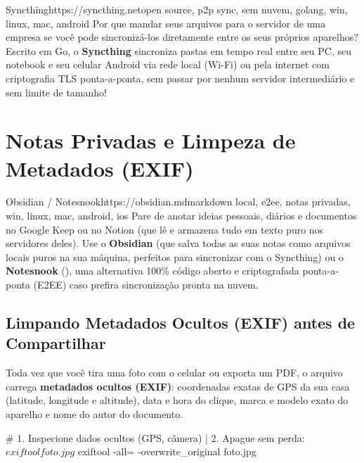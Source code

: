 \documentclass{pousadaguide}
\begin{document}
\begin{ferramenta}[goat,logo=syncthing]{Syncthing}{https://syncthing.net}{open source, p2p sync, sem nuvem, golang, win, linux, mac, android}
Por que mandar seus arquivos para o servidor de uma empresa se você pode sincronizá-los diretamente entre os seus próprios aparelhos? Escrito em Go, o \textbf{Syncthing} sincroniza pastas em tempo real entre seu PC, seu notebook e seu celular Android via rede local (Wi-Fi) ou pela internet com criptografia TLS ponta-a-ponta, sem passar por nenhum servidor intermediário e sem limite de tamanho! 
\end{ferramenta}

\section{Notas Privadas e Limpeza de Metadados (EXIF)}

\begin{ferramenta}[goat,logo=obsidian]{Obsidian / Notesnook}{https://obsidian.md}{markdown local, e2ee, notas privadas, win, linux, mac, android, ios}
Pare de anotar ideias pessoais, diários e documentos no Google Keep ou no Notion (que lê e armazena tudo em texto puro nos servidores deles). Use o \textbf{Obsidian} (que salva todas as suas notas como arquivos  locais puros na sua máquina, perfeitos para sincronizar com o Syncthing) ou o \textbf{Notesnook} (), uma alternativa 100\% código aberto e criptografada ponta-a-ponta (E2EE) caso prefira sincronização pronta na nuvem. 
\end{ferramenta}

\subsection{Limpando Metadados Ocultos (EXIF) antes de Compartilhar}

Toda vez que você tira uma foto com o celular ou exporta um PDF, o arquivo carrega \textbf{metadados ocultos (EXIF)}: coordenadas exatas de GPS da sua casa (latitude, longitude e altitude), data e hora do clique, marca e modelo exato do aparelho e nome do autor do documento.

\begin{terminal}
# 1. Inspecione dados ocultos (GPS, câmera) | 2. Apague sem perda:
$ exiftool foto.jpg
$ exiftool -all= -overwrite_original foto.jpg
\end{terminal}
\end{document}
